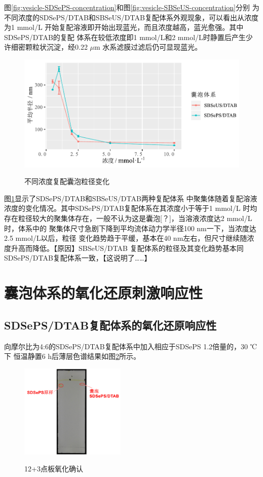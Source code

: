 \documentclass[bachelor,fandolfonts,replaceperiod]{jnuthesis}
\begin{document}
    图\ref{fig:vesicle-SDSePS-concentration}和图\ref{fig:vesicle-SBSeUS-concentration}分别
    为不同浓度的SDSePS/DTAB和SBSeUS/DTAB复配体系外观现象，可以看出从浓度为1 mmol/L
    开始复配溶液即开始出现蓝光，而且浓度越高，蓝光愈强。其中SDSePS/DTAB的复配
    体系在较低浓度即1 mmol/L和2 mmol/L时静置后产生少许细密颗粒状沉淀，经0.22 $\mu$m
    水系滤膜过滤后仍可显现蓝光。
    
    \begin{figure}[htbp]
        \centering
        \includegraphics[width=.825\textwidth]{Figure/vesicle-concentration-line.pdf}\\
        \caption{不同浓度复配囊泡粒径变化}\label{fig:vesicle-concentration-line}
    \end{figure}
    
    图\ref{fig:vesicle-concentration-line}显示了SDSePS/DTAB和SBSeUS/DTAB两种复配体系
    中聚集体随着复配溶液浓度的变化情况。其中SDSePS/DTAB复配体系在其浓度小于等于1 mmol/L
    时均存在粒径较大的聚集体存在，一般不认为这是囊泡[？]，当溶液浓度达2 mmol/L时，体系中的
    聚集体尺寸急剧下降到平均流体动力学半径100 nm一下，当浓度达2.5 mmol/L以后，粒径
    变化趋势趋于平缓，基本在40 nm左右，但尺寸继续随浓度升高而降低。【原因】SBSeUS/DTAB
    复配体系的粒径及其变化趋势基本同SDSePS/DTAB复配体系一致，【这说明了……】
    
    \section{囊泡体系的氧化还原刺激响应性}
    \subsection{SDSePS/DTAB复配体系的氧化还原响应性}
    向摩尔比为4:6的SDSePS/DTAB复配体系中加入相应于SDSePS 1.2倍量的，30 ℃下
    恒温静置6 h后薄层色谱结果如图\ref{fig:SDSePS-Ox-tlc}所示。
    \begin{figure}[htbp]
        \centering
        \includegraphics[height=4.5cm]{figure/SDSePS-Ox-tlc.jpg}\\
        \caption{12+3点板氧化确认}\label{fig:SDSePS-Ox-tlc}
    \end{figure}
    
\end{document}
